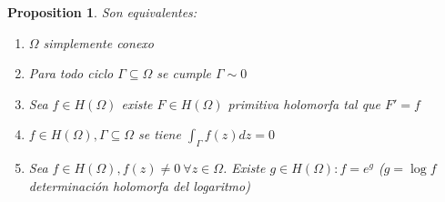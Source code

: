 \documentclass{myclass}
\newtheorem*{proposition}{Proposition}
\begin{document}
\begin{proposition} Son equivalentes:
\begin{enumerate}[topsep=-6pt, itemsep=0pt]
  \item $\Omega $ simplemente conexo
  \item Para todo ciclo $\Gamma \subseteq \Omega $ se cumple $\Gamma \sim 0$ 
  \item Sea $f\in H(\Omega )$ existe $F\in H(\Omega )$ primitiva holomorfa tal que $F' = f$
  \item $f\in H(\Omega ), \Gamma \subseteq \Omega$ se tiene $\int_\Gamma f(z)dz = 0$ 
  \item Sea  $f \in H(\Omega ), f(z)\neq 0 \ \forall z\in \Omega $. Existe $g \in H(\Omega ): f = e^g$ ($g=\log f$ determinación holomorfa del logaritmo)
\end{enumerate}
\end{proposition}
\end{document}

